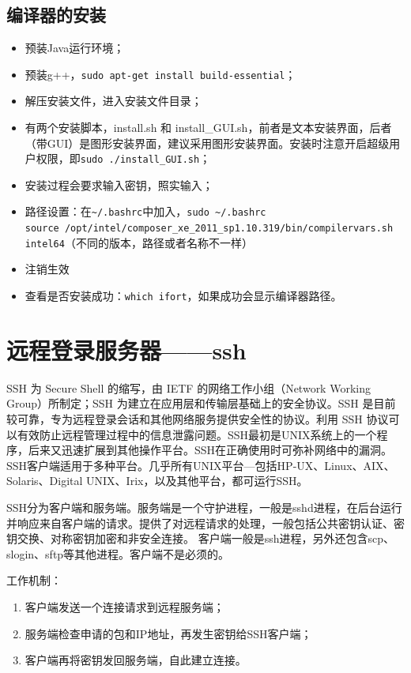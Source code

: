 \subsection{编译器的安装}
\begin{itemize}
\item 预装Java运行环境；
\item 预装g++，\verb*|sudo apt-get install build-essential|；
\item 解压安装文件，进入安装文件目录；
\item 有两个安装脚本，install.sh 和 install\_GUI.sh，前者是文本安装界面，后者（带GUI）是图形安装界面，建议采用图形安装界面。安装时注意开启超级用户权限，即\verb|sudo ./install_GUI.sh|；
\item 安装过程会要求输入密钥，照实输入；
\item 路径设置：在\verb*|~/.bashrc|中加入，\verb|sudo ~/.bashrc|\\
\verb|source /opt/intel/composer_xe_2011_sp1.10.319/bin/compilervars.sh intel64|（不同的版本，路径或者名称不一样）
\item 注销生效
\item 查看是否安装成功：\verb|which ifort|，如果成功会显示编译器路径。
\end{itemize}






\section{远程登录服务器——ssh}
SSH 为 Secure Shell 的缩写，由 IETF 的网络工作小组（Network Working Group）所制定；SSH 为建立在应用层和传输层基础上的安全协议。SSH 是目前较可靠，专为远程登录会话和其他网络服务提供安全性的协议。利用 SSH 协议可以有效防止远程管理过程中的信息泄露问题。SSH最初是UNIX系统上的一个程序，后来又迅速扩展到其他操作平台。SSH在正确使用时可弥补网络中的漏洞。SSH客户端适用于多种平台。几乎所有UNIX平台—包括HP-UX、Linux、AIX、Solaris、Digital UNIX、Irix，以及其他平台，都可运行SSH。

SSH分为客户端和服务端。服务端是一个守护进程，一般是sshd进程，在后台运行并响应来自客户端的请求。提供了对远程请求的处理，一般包括公共密钥认证、密钥交换、对称密钥加密和非安全连接。
客户端一般是ssh进程，另外还包含scp、slogin、sftp等其他进程。客户端不是必须的。

工作机制：
\begin{enumerate}
\item 客户端发送一个连接请求到远程服务端；
\item 服务端检查申请的包和IP地址，再发生密钥给SSH客户端；
\item 客户端再将密钥发回服务端，自此建立连接。
\end{enumerate}


